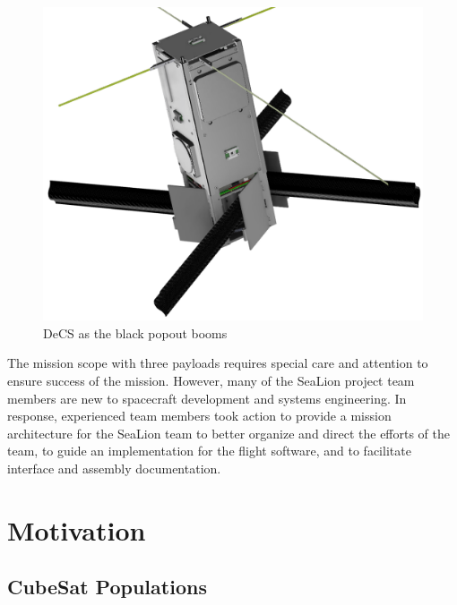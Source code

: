 \documentclass[journal,article,submit,pdftex,moreauthors]{Definitions/mdpi}
\begin{document}
\begin{figure}[H]
    \includegraphics[width=13.75 cm]{assets/decs.png}
    \caption{DeCS as the black popout booms}
	\label{fig:DeCS}
    \end{figure}
	\noindent   
\unskip

The mission scope with three payloads requires special care and attention to ensure success of the mission.  However, many of the SeaLion project team members are new to spacecraft development and systems engineering.  In response, experienced team members took action to provide a mission architecture for the SeaLion team to better organize and direct the efforts of the team, to guide an implementation for the flight software, and to facilitate interface and assembly documentation.

\section{Motivation}
\subsection{CubeSat Populations}
\end{document}

